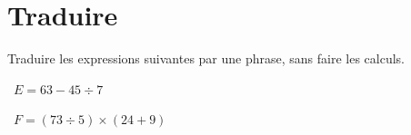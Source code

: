 \begin{questions}
%		
	\end{questions}


\section{Traduire}
Traduire les expressions suivantes par une phrase, sans faire les calculs.
\begin{questions}
	
	\question[3]  $E = 63 - 45 \div 7$
	\fillwithdottedlines{3cm}
	
	
	\question[3]  $F = (73 \div 5) \times (24 + 9)$
	\fillwithdottedlines{3cm}
\end{questions}
	
	
